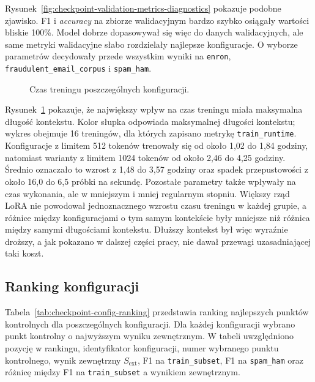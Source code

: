 Rysunek~\ref{fig:checkpoint-validation-metrics-diagnostics} pokazuje podobne
zjawisko. F1 i \emph{accuracy} na zbiorze walidacyjnym bardzo szybko osiągały
wartości bliskie 100\%. Model dobrze dopasowywał się więc do danych
walidacyjnych, ale same metryki walidacyjne słabo rozdzielały najlepsze
konfiguracje. O wyborze parametrów decydowały przede wszystkim wyniki na
\texttt{enron}, \texttt{fraudulent\_email\_corpus} i \texttt{spam\_ham}.

\begin{figure}[htbp]
\centering

\caption{Czas treningu poszczególnych konfiguracji.}
\label{fig:checkpoint-training-runtime-context}
\end{figure}

Rysunek~\ref{fig:checkpoint-training-runtime-context} pokazuje, że największy
wpływ na czas treningu miała maksymalna długość kontekstu. Kolor słupka
odpowiada maksymalnej długości kontekstu; wykres obejmuje 16 treningów, dla
których zapisano metrykę \texttt{train\_runtime}. Konfiguracje z
limitem 512 tokenów trenowały się od około 1,02 do 1,84 godziny, natomiast
warianty z limitem 1024 tokenów od około 2,46 do 4,25 godziny. Średnio oznaczało
to wzrost z 1,48 do 3,57 godziny oraz spadek przepustowości z około 16,0 do 6,5
próbki na sekundę. Pozostałe parametry także wpływały na czas wykonania, ale w
mniejszym i mniej regularnym stopniu. Większy rząd LoRA nie powodował
jednoznacznego wzrostu czasu treningu w każdej grupie, a różnice między
konfiguracjami o tym samym kontekście były mniejsze niż różnica między samymi
długościami kontekstu. Dłuższy kontekst był więc wyraźnie droższy, a jak pokazano
w dalszej części pracy, nie dawał przewagi uzasadniającej taki koszt.

\subsection{Ranking konfiguracji}

Tabela~\ref{tab:checkpoint-config-ranking} przedstawia ranking najlepszych
punktów kontrolnych dla poszczególnych konfiguracji. Dla każdej konfiguracji
wybrano punkt kontrolny o najwyższym wyniku zewnętrznym. W tabeli uwzględniono
pozycję w rankingu, identyfikator konfiguracji, numer wybranego punktu
kontrolnego, wynik zewnętrzny \(S_{\mathrm{ext}}\), F1 na
\texttt{train\_subset}, F1 na \texttt{spam\_ham} oraz różnicę między F1 na
\texttt{train\_subset} a wynikiem zewnętrznym.

